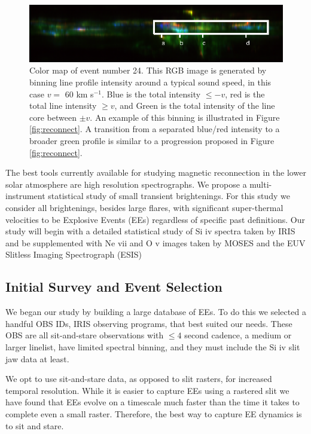 \documentclass[]{aastex6}
\begin{document}
\begin{figure}
	\caption{Color map of event number 24. This RGB image is generated by binning line profile intensity around a typical sound speed, in this case $v = $ 60 km s$^{-1}$.  Blue is the total intensity  $\leq -v$, red is the total line intensity $\geq v$, and Green is the total intensity of the line core between $\pm v$. An example of this binning is illustrated in Figure \ref{fig:reconnect}.  A transition from a separated blue/red intensity to a broader green profile is similar to a progression proposed in Figure \ref{fig:reconnect}.}
	\label{fig:eecolor}
	\centerline{\includegraphics[scale=2]{NESSF_img/ee_color.eps}}
	
\end{figure}

The best tools currently available for studying magnetic reconnection in the lower solar atmosphere are high resolution spectrographs.  We propose a multi-instrument statistical study of small transient brightenings.  For this study we consider all brightenings, besides large flares, with significant super-thermal velocities to be Explosive Events (EEs) regardless of specific past definitions.  Our study will begin with a detailed statistical study of Si {\sc iv} spectra taken by IRIS and be supplemented with Ne {\sc vii} and O {\sc v} images taken by MOSES and the EUV Slitless Imaging Spectrograph (ESIS)

	\subsection{Initial Survey and Event Selection}
	We began our study by building a large database of EEs.  To do this we selected a handful OBS IDs, IRIS observing programs, that best suited our needs.  These OBS are all sit-and-stare observations with $\leq 4$ second cadence, a medium or larger linelist, have limited spectral binning, and they must include the Si {\sc iv} slit jaw data at least.   
	
	We opt to use sit-and-stare data, as opposed to slit rasters, for increased temporal resolution.  While it is easier to capture EEs using a rastered slit we have found that EEs evolve on a timescale much faster than the time it takes to complete even a small raster.  Therefore, the best way to capture EE dynamics is to sit and stare.  
	
\end{document}
